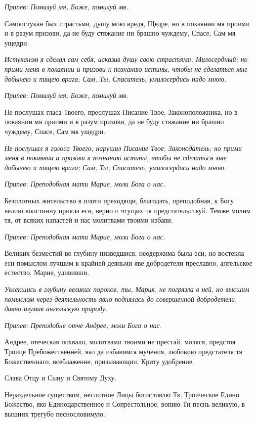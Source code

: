 \itshape Припев:\normalfont{} Помилуй мя, Боже, помилуй мя.


Самоистукан бых страстьми, душу мою вредя, Щедре, но в покаянии мя приими и в разум призови, да не буду стяжание ни брашно чуждему, Спасе, Сам мя ущедри.


\itshape Истуканом я сделал сам себя, исказив душу свою страстями, Милосердный; но прими меня в покаянии и призови к познанию истины, чтобы не сделаться мне добычею и пищею врага; Сам, Ты, Спаситель, умилосердись надо мною.\normalfont{}


\itshape Припев:\normalfont{} Помилуй мя, Боже, помилуй мя.


Не послушах гласа Твоего, преслушах Писание Твое, Законоположника, но в покаянии мя приими и в разум призови, да не буду стяжание ни брашно чуждему, Спасе, Сам мя ущедри.


\itshape Не послушал я голоса Твоего, нарушил Писание Твое, Законодатель; но прими меня в покаянии и призови к познанию истины, чтобы не сделаться мне добычею и пищею врага; Сам, Ты, Спаситель, умилосердись надо мною.\normalfont{}


\itshape Припев:\normalfont{} Преподобная мати Марие, моли Бога о нас.


Безплотных жительство в плоти преходящи, благодать, преподобная, к Богу велию воистинну прияла еси, верно о чтущих тя предстательствуй. Темже молим тя, от всяких напастей и нас молитвами твоими избави.


\itshape Припев:\normalfont{} Преподобная мати Марие, моли Бога о нас.


Великих безместий во глубину низведшися, неодержима была еси; но востекла еси помыслом лучшим к крайней деяньми яве добродетели преславно, ангельское естество, Марие, удививши.


\itshape Увлекшись в глубину великих пороков, ты, Мария, не погрязла в ней, но высшим помыслом через деятельность явно поднялась до совершенной добродетели, дивно изумив ангельскую природу.\normalfont{}


\itshape Припев:\normalfont{} Преподобне отче Андрее, моли Бога о нас.


Андрее, отеческая похвало, молитвами твоими не престай, моляся, предстоя Троице Пребожественней, яко да избавимся мучения, любовию предстателя тя Божественнаго, всеблаженне, призывающии, Криту удобрение.


Слава Отцу и Сыну и Святому Духу.


Нераздельное существом, неслитное Лицы богословлю Тя, Троическое Едино Божество, яко Единоцарственное и Сопрестольное, вопию Ти песнь великую, в вышних трегубо песнословимую.


